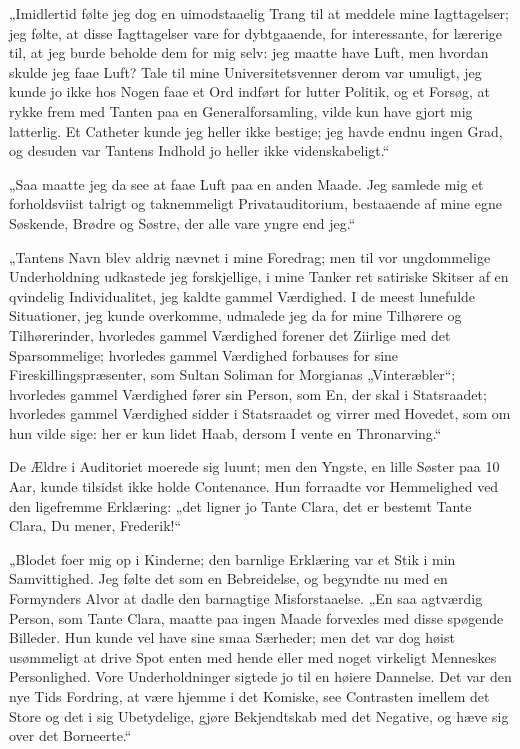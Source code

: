 \documentclass[12pt,a4paper]{book}
\newcommand{\apage}[1]{\marginnote{\footnotesize\textit{[#1]}}}
\begin{document}
„Imidlertid følte jeg dog en uimodstaaelig Trang til at meddele mine Iagttagelser; jeg følte, at disse Iagttagelser vare for dybtgaaende, for interessante, for lærerige til, at jeg burde beholde dem for mig selv: jeg maatte have Luft, men hvordan skulde jeg faae Luft? Tale til mine Universitetsvenner derom var umuligt, jeg kunde jo ikke hos Nogen faae et Ord indført for lutter Politik, og et Forsøg, at rykke frem med Tanten paa en Generalforsamling, vilde kun have gjort mig latterlig. Et Catheter kunde jeg heller ikke bestige; jeg havde endnu ingen Grad, og desuden var Tantens Indhold jo heller ikke videnskabeligt.“

„Saa maatte jeg da see at faae Luft paa en anden Maade. Jeg samlede mig et forholdsviist talrigt og taknemmeligt Privatauditorium, bestaaende af mine egne Søskende, Brødre og Søstre, der alle vare yngre end jeg.“

„Tantens Navn blev aldrig nævnet i mine Foredrag; men til vor ungdommelige Underholdning udkastede jeg forskjellige, i mine Tanker ret satiriske Skitser af en qvindelig Individualitet, jeg kaldte gammel Værdighed. I de meest lunefulde Situationer, jeg kunde overkomme, udmalede jeg da for mine Tilhørere og Tilhørerinder, hvorledes gammel Værdighed forener det Ziirlige med det Sparsommelige; hvorledes gammel Værdighed forbauses for sine Fireskillingspræsenter, som Sultan Soliman for Morgianas „Vinteræbler“; hvorledes gammel Værdighed fører sin Person, som En, der skal i Statsraadet; hvorledes gammel Værdighed sidder
i \apage{73} Statsraadet og virrer med Hovedet, som om hun vilde sige: her er kun lidet Haab, dersom I vente en Thronarving.“

De Ældre i Auditoriet moerede sig luunt; men den Yngste, en lille Søster paa 10 Aar, kunde tilsidst ikke holde Contenance. Hun forraadte vor Hemmelighed ved den ligefremme Erklæring: „det ligner jo Tante Clara, det er bestemt Tante Clara, Du mener, Frederik!“

„Blodet foer mig op i Kinderne; den barnlige Erklæring var et Stik i min Samvittighed. Jeg følte det som en Bebreidelse, og begyndte nu med en Formynders Alvor at dadle den barnagtige Misforstaaelse. „En saa agtværdig Person, som Tante Clara, maatte paa ingen Maade forvexles med disse spøgende Billeder. Hun kunde vel have sine smaa Særheder; men det var dog høist usømmeligt at drive Spot enten med hende eller med noget virkeligt Menneskes Personlighed. Vore Underholdninger sigtede jo til en høiere Dannelse. Det var den nye Tids Fordring, at være hjemme i det Komiske, see Contrasten imellem det Store og det i sig Ubetydelige, gjøre Bekjendtskab med det Negative, og hæve sig over det Borneerte.“
\end{document}
